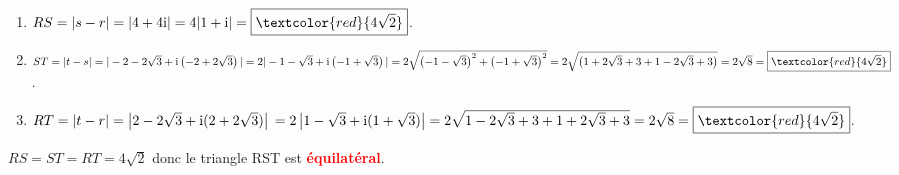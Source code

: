 \documentclass[12pt]{article}
\begin{document}
\begin{enumerate}
\begin{enumerate}
\begin{enumerate}[$\bullet$]
\item 		$RS=\vert s-r \vert=\vert 4+4\mathrm{i} \vert=4\vert 1+\mathrm{i} \vert=\boxed{\textcolor{red}{4\sqrt{2}}}$.

\item $ST=\vert t-s \vert=\vert -2-2\sqrt{3}+\mathrm{i}\left(-2+2\sqrt{3}\right) \vert=2\vert -1-\sqrt{3}+\mathrm{i}\left(-1+\sqrt{3}\right) \vert\\
=2\sqrt{\left(-1-\sqrt{3}\right)^2+\left(-1+\sqrt{3}\right)^2}=2\sqrt{\left(1+2\sqrt{3}+3+1-2\sqrt{3}+3\right)}=2\sqrt{8}\\
=\boxed{\textcolor{red}{4\sqrt{2}}}$.

\item $RT=\vert t-r \vert = \left\vert 2-2\sqrt{3}+\mathrm{i}(2+2\sqrt{3}) \right\vert\\
=2\left\vert 1-\sqrt{3}+\mathrm{i}(1+\sqrt{3}) \right\vert = 2\sqrt{1 - 2\sqrt{3}+ 3 +1 + 2\sqrt{3} + 3} = 2\sqrt{8}\\
=\boxed{\textcolor{red}{4\sqrt{2}}}$.
\end{enumerate}

$RS = ST = RT = 4\sqrt{2}$ donc le triangle RST est \textbf{\textcolor{red}{équilatéral}}.

\end{enumerate}
\end{enumerate}
\end{document}
